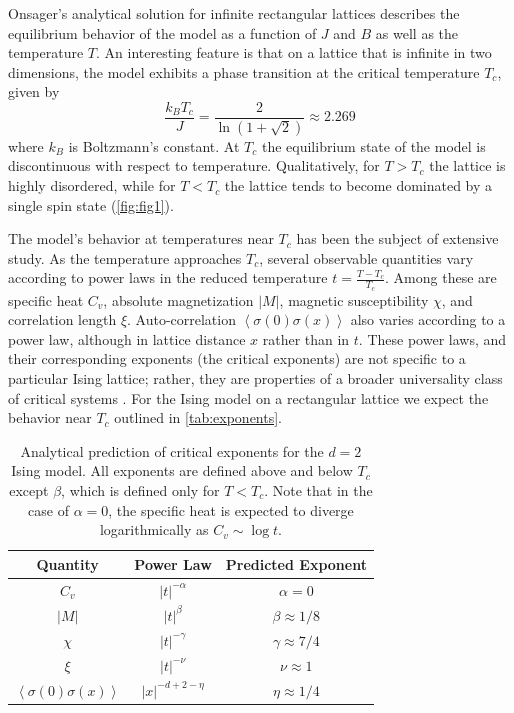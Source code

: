 \documentclass[letter,scriptaddress,twocolumn, prl,nofootinbib]{revtex4}
\newcommand{\submin}[1]{\left\langle #1 \right\rangle}
\begin{document}
Onsager's analytical solution for infinite rectangular lattices \cite{Onsager} describes the equilibrium behavior of the model as a function of $J$ and $B$ as well as the temperature $T$. An interesting feature is that on a lattice that is infinite in two dimensions, the model exhibits a phase transition at the critical temperature $T_c$, given by
\begin{equation}
	\label{eq:Tc}
	\frac{k_B T_c}{J} = \frac{2}{\ln{(1+\sqrt{2})}} \approx 2.269
\end{equation}
where $k_B$ is Boltzmann's constant. At $T_c$ the equilibrium state of the model is discontinuous with respect to temperature. Qualitatively, for $T > T_c$ the lattice is highly disordered, while for $T < T_c$ the lattice tends to become dominated by a single spin state (\autoref{fig:fig1}).

The model's behavior at temperatures near $T_c$ has been the subject of extensive study. As the temperature approaches $T_c$, several observable quantities vary according to power laws in the reduced temperature $t = \frac{T - T_c}{T_c}$. Among these are specific heat $C_v$, absolute magnetization $|M|$, magnetic susceptibility $\chi$, and correlation length $\xi$. Auto-correlation $\submin{\sigma(0)\sigma(x)}$ also varies according to a power law, although in lattice distance $x$ rather than in $t$. These power laws, and their corresponding exponents (the critical exponents) are not specific to a particular Ising lattice; rather, they are properties of a broader universality class of critical systems \cite{Stanley}. For the Ising model on a rectangular lattice we expect the behavior near $T_c$ outlined in \autoref{tab:exponents}.

\begin{table}[h]
	\begin{center}
		\begin{tabular}{|c|c|c|}
			\hline
	Quantity & Power Law & Predicted Exponent \\
			\hline
			$C_v$ & $|t|^{-\alpha}$ & $\alpha = 0$ \\
			$|M|$ & $|t|^\beta$ & $\beta \approx 1/8$ \\
			$\chi$ & $|t|^{-\gamma}$ & $\gamma \approx 7/4$ \\
			$\xi$ & $|t|^{-\nu}$ & $\nu \approx 1$ \\
			$\submin{\sigma(0)\sigma(x)}$ & $|x|^{-d + 2 - \eta}$ & $ \eta \approx 1/4$ \\
			\hline
		\end{tabular}
		\caption{Analytical prediction of critical exponents for the $d = 2$ Ising model. All exponents are defined above and below $T_c$ except $\beta$, which is defined only for $T < T_c$. Note that in the case of $\alpha = 0$, the specific heat is expected to diverge logarithmically as $C_v \sim \log t$.}
		\label{tab:exponents}
	\end{center}
 \end{table}
\end{document}
